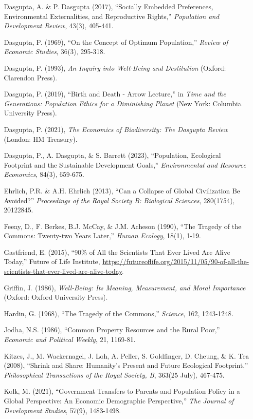 \documentclass[man,11pt,a4paper,floatsintext]{apa7}
\begin{document}
\begin{list}{}{\setlength{\leftmargin}{0.5in}\setlength{\itemindent}{-0.5in}\setlength{\itemsep}{0pt}\setlength{\parsep}{0pt}}
\item Dasgupta, A. \& P. Dasgupta (2017), ``Socially Embedded Preferences, Environmental Externalities, and Reproductive Rights,'' \textit{Population and Development Review}, 43(3), 405-441.
\item Dasgupta, P. (1969), ``On the Concept of Optimum Population,'' \textit{Review of Economic Studies}, 36(3), 295-318.
\item Dasgupta, P. (1993), \textit{An Inquiry into Well-Being and Destitution} (Oxford: Clarendon Press).
\item Dasgupta, P. (2019), ``Birth and Death - Arrow Lecture,'' in \textit{Time and the Generations: Population Ethics for a Diminishing Planet} (New York: Columbia University Press).
\item Dasgupta, P. (2021), \textit{The Economics of Biodiversity: The Dasgupta Review} (London: HM Treasury).
\item Dasgupta, P., A. Dasgupta, \& S. Barrett (2023), ``Population, Ecological Footprint and the Sustainable Development Goals,'' \textit{Environmental and Resource Economics}, 84(3), 659-675.
\item Ehrlich, P.R. \& A.H. Ehrlich (2013), ``Can a Collapse of Global Civilization Be Avoided?'' \textit{Proceedings of the Royal Society B: Biological Sciences}, 280(1754), 20122845.
\item Feeny, D., F. Berkes, B.J. McCay, \& J.M. Acheson (1990), ``The Tragedy of the Commons: Twenty-two Years Later,'' \textit{Human Ecology}, 18(1), 1-19.
\item Gastfriend, E. (2015), ``90\% of All the Scientists That Ever Lived Are Alive Today,'' Future of Life Institute, \url{https://futureoflife.org/2015/11/05/90-of-all-the-scientists-that-ever-lived-are-alive-today}.
\item Griffin, J. (1986), \textit{Well-Being: Its Meaning, Measurement, and Moral Importance} (Oxford: Oxford University Press).
\item Hardin, G. (1968), ``The Tragedy of the Commons,'' \textit{Science}, 162, 1243-1248.
\item Jodha, N.S. (1986), ``Common Property Resources and the Rural Poor,'' \textit{Economic and Political Weekly}, 21, 1169-81.
\item Kitzes, J., M. Wackernagel, J. Loh, A. Peller, S. Goldfinger, D. Cheung, \& K. Tea (2008), ``Shrink and Share: Humanity's Present and Future Ecological Footprint,'' \textit{Philosophical Transactions of the Royal Society, B}, 363(25 July), 467-475.
\item Kolk, M. (2021), ``Government Transfers to Parents and Population Policy in a Global Perspective: An Economic Demographic Perspective,'' \textit{The Journal of Development Studies}, 57(9), 1483-1498.

\end{list}
\end{document}
